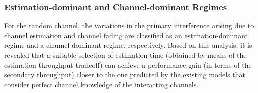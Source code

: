\subsubsection{Estimation-dominant and Channel-dominant Regimes}
For the random channel, the variations in the primary interference arising due to channel estimation and channel fading are classified as an estimation-dominant regime and a channel-dominant regime, respectively. Based on this analysis, it is revealed that a suitable selection of estimation time (obtained by means of the estimation-throughput tradeoff) can achieve a performance gain (in terms of the secondary throughput) closer to the one predicted by the existing models that consider perfect channel knowledge of the interacting channels. 



